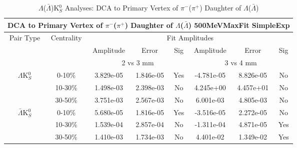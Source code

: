 \documentclass[../AnalysisNoteJBuxton.tex]{subfiles}
\begin{document}
\begin{table}
 \centering
 \begin{tabular}{|c|c|c|c|c||c|c|c|}
  \multicolumn{8}{c}{DCA to Primary Vertex of $\pi^{-}$($\pi^{+}$) Daughter of $\Lambda$($\bar{\Lambda}$) 500MeVMaxFit SimpleExp} \\
  \hline
  \multirow{3}{*}{Pair Type} & \multirow{3}{*}{Centrality} & \multicolumn{6}{c|}{Fit Amplitudes} \\
  \cline{3-8}
   & & Amplitude & Error & Sig & Amplitude & Error & Sig \\  
  \cline{3-8}
   & & \multicolumn{3}{c||}{2 vs 3 mm} & \multicolumn{3}{c|}{3 vs 4 mm} \\  
  \hline  
  \multirow{3}{*}{$\Lambda$K$^{0}_{S}$}  
   &  0-10\% & 3.829e-05 & 1.846e-05 & Yes & -4.781e-05 & 8.826e-05 & No \\
   & 10-30\% & 1.498e-03 & 2.398e-03 & No & 4.245e+00 & 4.457e+01 & No \\
   & 30-50\% & 3.751e-03 & 2.567e-03 & No & 6.001e-03 & 4.805e-03 & No \\
  \hline  
  \multirow{3}{*}{$\bar{\Lambda}$K$^{0}_{S}$}  
   &  0-10\% & 5.680e-05 & 1.816e-05 & Yes & -3.516e-05 & 2.272e-05 & No \\
   & 10-30\% & 1.539e-04 & 2.857e-04 & No & -1.311e-04 & 4.871e-05 & Yes \\
   & 30-50\% & 1.410e-03 & 1.734e-03 & No & 4.401e-02 & 1.349e-02 & Yes \\
  \hline
 \end{tabular}
 \caption{$\Lambda$($\bar{\Lambda}$)K$^{0}_{S}$ Analyses: DCA to Primary Vertex of $\pi^{-}$($\pi^{+}$) Daughter of $\Lambda$($\bar{\Lambda}$)}
 \label{tab:DcaToPrimVertexPionDaughtOfLamLamK0_500MeVMaxFit_SimpleExp}
\end{table}



\clearpage
\end{document}
